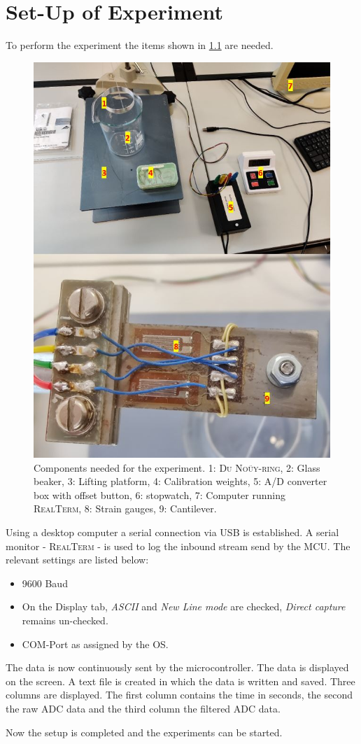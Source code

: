 \chapter{Set-Up of Experiment}
To perform the experiment the items shown in \cref{fig:setup} are needed.
 \begin{figure}[H]
	\centering
	\includegraphics[width=.7\textwidth]{aufbau/Setup/setup_num}
	\caption[Components needed for the experiment]{Components needed for the experiment. 1: \textsc{Du Noüy-ring}, 2: Glass beaker, 3: Lifting platform, 4: Calibration weights, 5: A/D converter box with offset button, 6: stopwatch, 7: Computer running \textsc{RealTerm}, 8: Strain gauges, 9: Cantilever.}
	\label{fig:setup}
\end{figure}

Using a desktop computer a serial connection via USB is established. A serial monitor - \textsc{RealTerm} - is used to log the inbound stream send by the MCU. The relevant settings are listed below:
\begin{itemize}
	\item 9600 Baud
	\item On the Display tab, \textit{ASCII} and \textit{New Line mode} are checked, \textit{Direct capture} remains
	un-checked.
	\item COM-Port as assigned by the OS.
\end{itemize}
The data is now continuously sent by the microcontroller. The data is displayed on the screen. A text file is created in which the data is written and saved. Three columns are displayed. The first column contains the time in seconds, the second the raw ADC data and the third column the filtered ADC data.\par
Now the setup is completed and the experiments can be started.

